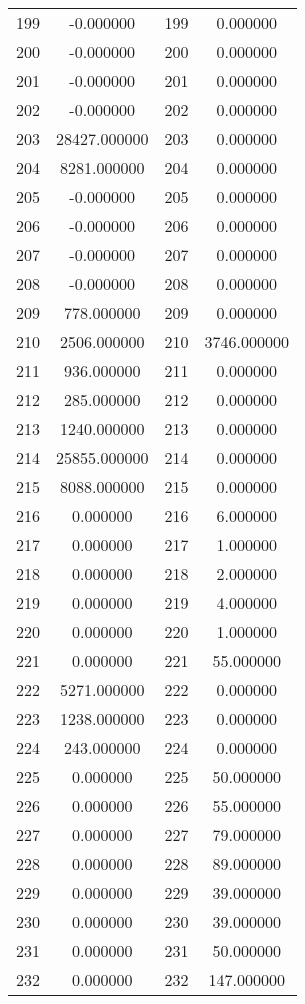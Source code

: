 \documentclass[12pt]{article}
\begin{document}
\begin{longtable}{@{}cccc@{}}
199 & -0.000000 & 199 & 0.000000 \\
200 & -0.000000 & 200 & 0.000000 \\
201 & -0.000000 & 201 & 0.000000 \\
202 & -0.000000 & 202 & 0.000000 \\
203 & 28427.000000 & 203 & 0.000000 \\
204 & 8281.000000 & 204 & 0.000000 \\
205 & -0.000000 & 205 & 0.000000 \\
206 & -0.000000 & 206 & 0.000000 \\
207 & -0.000000 & 207 & 0.000000 \\
208 & -0.000000 & 208 & 0.000000 \\
209 & 778.000000 & 209 & 0.000000 \\
210 & 2506.000000 & 210 & 3746.000000 \\
211 & 936.000000 & 211 & 0.000000 \\
212 & 285.000000 & 212 & 0.000000 \\
213 & 1240.000000 & 213 & 0.000000 \\
214 & 25855.000000 & 214 & 0.000000 \\
215 & 8088.000000 & 215 & 0.000000 \\
216 & 0.000000 & 216 & 6.000000 \\
217 & 0.000000 & 217 & 1.000000 \\
218 & 0.000000 & 218 & 2.000000 \\
219 & 0.000000 & 219 & 4.000000 \\
220 & 0.000000 & 220 & 1.000000 \\
221 & 0.000000 & 221 & 55.000000 \\
222 & 5271.000000 & 222 & 0.000000 \\
223 & 1238.000000 & 223 & 0.000000 \\
224 & 243.000000 & 224 & 0.000000 \\
225 & 0.000000 & 225 & 50.000000 \\
226 & 0.000000 & 226 & 55.000000 \\
227 & 0.000000 & 227 & 79.000000 \\
228 & 0.000000 & 228 & 89.000000 \\
229 & 0.000000 & 229 & 39.000000 \\
230 & 0.000000 & 230 & 39.000000 \\
231 & 0.000000 & 231 & 50.000000 \\
232 & 0.000000 & 232 & 147.000000 \\

\end{longtable}
\end{document}
